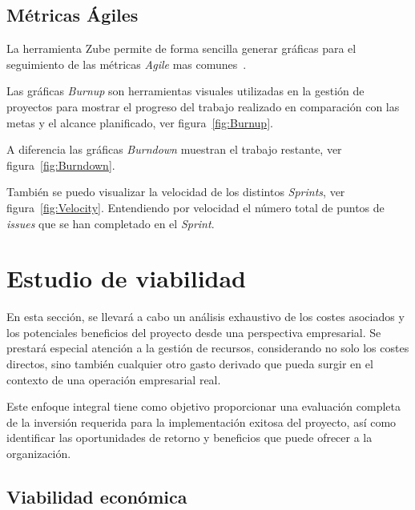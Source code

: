 \subsection{Métricas Ágiles}

La herramienta Zube permite de forma sencilla generar gráficas para el seguimiento de las métricas \textit{Agile} mas comunes~\cite{metricas}.

Las gráficas \textit{Burnup} son herramientas visuales utilizadas en la gestión de proyectos para mostrar el progreso del trabajo realizado en comparación con las metas y el alcance planificado, ver figura~\ref{fig:Burnup}.


A diferencia las gráficas \textit{Burndown} muestran el trabajo restante, ver figura~\ref{fig:Burndown}.


También se puedo visualizar la velocidad de los distintos \textit{Sprints}, ver figura~\ref{fig:Velocity}. Entendiendo por velocidad el número total de puntos de \textit{issues} que se han completado en el \textit{Sprint}.


\section{Estudio de viabilidad}

En esta sección, se llevará a cabo un análisis exhaustivo de los costes asociados y los potenciales beneficios del proyecto desde una perspectiva empresarial. Se prestará especial atención a la gestión de recursos, considerando no solo los costes directos, sino también cualquier otro gasto derivado que pueda surgir en el contexto de una operación empresarial real. 

Este enfoque integral tiene como objetivo proporcionar una evaluación completa de la inversión requerida para la implementación exitosa del proyecto, así como identificar las oportunidades de retorno y beneficios que puede ofrecer a la organización.

\subsection{Viabilidad económica}

